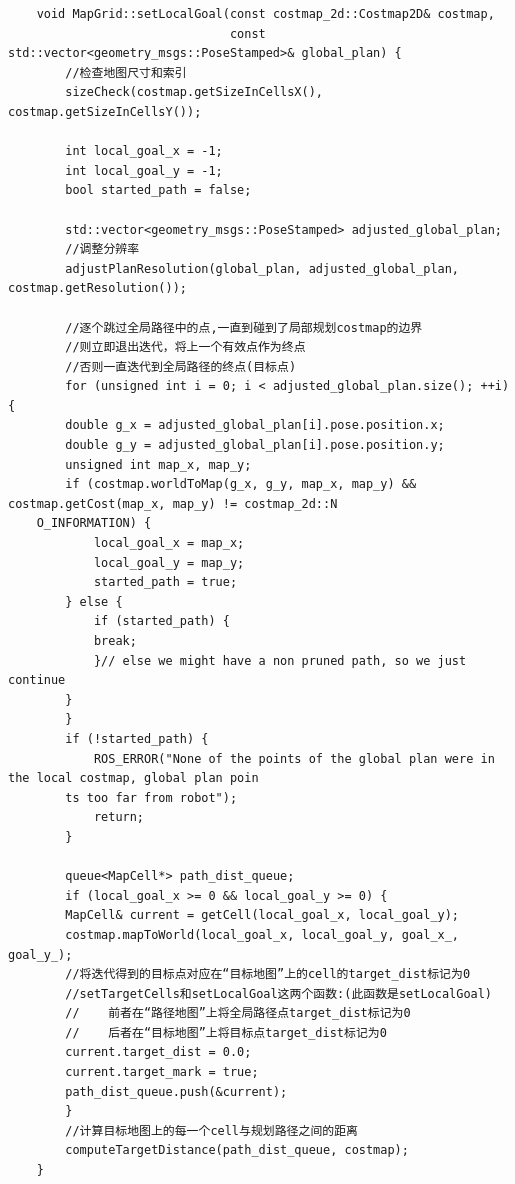 \documentclass[9pt, oneside]{book}
\begin{document}
\footnotesize
\begin{verbatim}
    void MapGrid::setLocalGoal(const costmap_2d::Costmap2D& costmap,
                               const std::vector<geometry_msgs::PoseStamped>& global_plan) {
        //检查地图尺寸和索引
        sizeCheck(costmap.getSizeInCellsX(), costmap.getSizeInCellsY());

        int local_goal_x = -1;
        int local_goal_y = -1;
        bool started_path = false;

        std::vector<geometry_msgs::PoseStamped> adjusted_global_plan;
        //调整分辨率
        adjustPlanResolution(global_plan, adjusted_global_plan, costmap.getResolution());

        //逐个跳过全局路径中的点,一直到碰到了局部规划costmap的边界
        //则立即退出迭代，将上一个有效点作为终点
        //否则一直迭代到全局路径的终点(目标点)
        for (unsigned int i = 0; i < adjusted_global_plan.size(); ++i) {
        double g_x = adjusted_global_plan[i].pose.position.x;
        double g_y = adjusted_global_plan[i].pose.position.y;
        unsigned int map_x, map_y;
        if (costmap.worldToMap(g_x, g_y, map_x, map_y) && costmap.getCost(map_x, map_y) != costmap_2d::N
    O_INFORMATION) {
            local_goal_x = map_x;
            local_goal_y = map_y;
            started_path = true;
        } else {
            if (started_path) {
            break;
            }// else we might have a non pruned path, so we just continue
        }
        }
        if (!started_path) {
            ROS_ERROR("None of the points of the global plan were in the local costmap, global plan poin
        ts too far from robot");
            return;
        }

        queue<MapCell*> path_dist_queue;
        if (local_goal_x >= 0 && local_goal_y >= 0) {
        MapCell& current = getCell(local_goal_x, local_goal_y);
        costmap.mapToWorld(local_goal_x, local_goal_y, goal_x_, goal_y_);
        //将迭代得到的目标点对应在“目标地图”上的cell的target_dist标记为0
        //setTargetCells和setLocalGoal这两个函数:(此函数是setLocalGoal)
        //    前者在“路径地图”上将全局路径点target_dist标记为0
        //    后者在“目标地图”上将目标点target_dist标记为0
        current.target_dist = 0.0;
        current.target_mark = true;
        path_dist_queue.push(&current);
        }
        //计算目标地图上的每一个cell与规划路径之间的距离
        computeTargetDistance(path_dist_queue, costmap);
    }
\end{verbatim}
\normalsize
\end{document}
